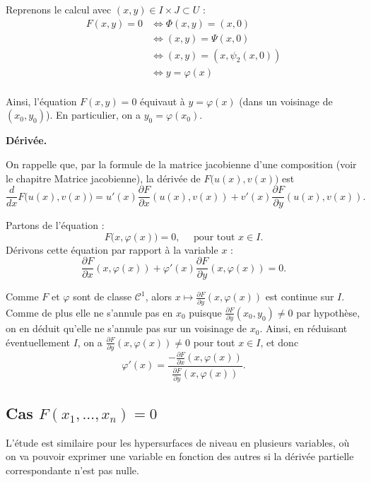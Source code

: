 \documentclass[11pt, class=report,crop=false]{standalone}
\begin{document}
Reprenons le calcul avec $(x,y) \in I \times J \subset U$ :
\begin{align*}
F(x,y) = 0
&\iff \Phi(x,y) = (x,0) \\
&\iff (x,y) = \Psi(x,0) \\
&\iff (x,y) = (x, \psi_2(x,0) ) \\
&\iff y = \varphi(x) \\
\end{align*}   

Ainsi, l'équation $F(x,y)=0$ équivaut à $y=\varphi(x)$ (dans un voisinage de $(x_0,y_0)$). En particulier, on a $y_0 = \varphi(x_0)$.

\bigskip

\textbf{Dérivée.}

On rappelle que, par la formule de la matrice jacobienne d'une composition (voir le chapitre \og{}Matrice jacobienne\fg{}), la dérivée de $F\big( u(x), v(x) \big)$ est
$$\frac{d}{dx}F\big( u(x), v(x) \big)
= u'(x) \frac{\partial F}{\partial x} (u(x), v(x)) + v'(x) \frac{\partial F}{\partial y}(u(x), v(x)).$$

Partons de l'équation :
$$F\big( x, \varphi(x) \big) = 0, \quad \text{ pour tout } x \in I.$$
Dérivons cette équation par rapport à la variable $x$ :
$$\frac{\partial F}{\partial x} (x, \varphi(x)) + \varphi'(x) \frac{\partial F}{\partial y} (x, \varphi(x)) = 0.$$

Comme $F$ et $\varphi$ sont de classe $\mathcal{C}^1$, alors $x \mapsto \frac{\partial F}{\partial y}(x, \varphi(x))$ est continue sur $I$. Comme de plus elle ne s'annule pas en $x_0$ puisque $\frac{\partial F}{\partial y}(x_0, y_0) \neq 0$ par hypothèse, on en déduit qu'elle ne s'annule pas sur un voisinage de $x_0$. Ainsi, en réduisant éventuellement $I$, on a $\frac{\partial F}{\partial y}(x, \varphi(x)) \neq 0$ pour tout $x \in I$, et donc 
$$\varphi'(x) = \frac{-\frac{\partial F}{\partial x}(x, \varphi(x))}{\frac{\partial F}{\partial y}(x, \varphi(x))}.$$

\subsection{Cas $F(x_1,\ldots,x_n) = 0$}

L'étude est similaire pour les hypersurfaces de niveau en plusieurs variables, où on va pouvoir exprimer une variable en fonction des autres si la dérivée partielle correspondante n'est pas nulle. 
\end{document}
